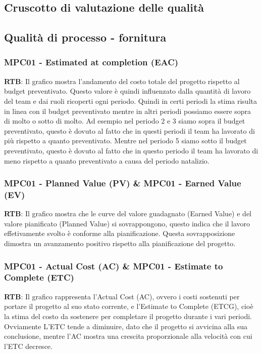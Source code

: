 \documentclass[10pt]{article}
\begin{document}
\begin{justify}
\section{Cruscotto di valutazione delle qualità}
\subsection{Qualità di processo - fornitura}
\subsubsection{MPC01 - Estimated at completion (EAC)}
\textbf{RTB}: Il grafico mostra l'andamento del costo totale del progetto rispetto al budget preventivato. Questo valore è quindi influenzato dalla quantità di lavoro del team e dai ruoli ricoperti ogni periodo. Quindi in certi periodi la stima risulta in linea con il budget preventivato mentre in altri periodi possiamo essere sopra di molto o sotto di molto. Ad esempio nel periodo 2 e 3 siamo sopra il budget preventivato, questo è dovuto al fatto che in questi periodi il team ha lavorato di più rispetto a quanto preventivato. Mentre nel periodo 5 siamo sotto il budget preventivato, questo è dovuto al fatto che in questo periodo il team ha lavorato di meno rispetto a quanto preventivato a causa del periodo natalizio.\\
\subsubsection{MPC01 - Planned Value (PV) \& MPC01 - Earned Value (EV)}
\textbf{RTB}: Il grafico mostra che le curve del valore guadagnato (Earned Value) e del valore pianificato (Planned Value) si sovrappongono, questo indica che il lavoro effetivamente svolto è conforme alla pianificazione. Questa sovrapposizione dimostra un avanzamento positivo rispetto alla pianificazione del progetto.
\subsubsection{MPC01 - Actual Cost (AC) \& MPC01 - Estimate to Complete (ETC)}
\textbf{RTB}: Il grafico rappresenta l'Actual Cost (AC), ovvero i costi sostenuti per portare il progetto al suo stato corrente, e l'Estimate to Complete (ETCG), cioè la stima del costo da sostenere per completare il progetto durante i vari periodi. \\
Ovviamente L'ETC tende a diminuire, dato che il progetto si avvicina alla sua conclusione, mentre l'AC mostra una crescita proporzionale alla velocità con cui l'ETC decresce.

\end{justify}
\end{document}
